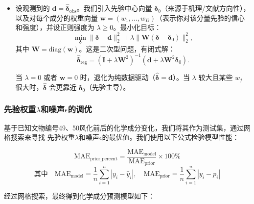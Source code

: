 \documentclass[withoutpreface,bwprint]{cumcmthesis}
\begin{document}
\begin{itemize}

\item 设观测到的 $\boldsymbol{d} = \hat{\boldsymbol{\delta}}_{\text{obs}}$。我们引入先验中心向量 $\boldsymbol{\delta}_0$（来源于机理/文献方向性），以及对每个成分的权重向量 $\mathbf{w} = (w_1, \ldots, w_D)$（表示你对该分量先验的信心和强度），并设正则强度为 $\lambda \geq 0$。最小化目标：
\[
\min_{\boldsymbol{\delta}} \|\boldsymbol{\delta} - \boldsymbol{d}\|_2^2 + \lambda \|\mathbf{W}(\boldsymbol{\delta} - \boldsymbol{\delta}_0)\|_2^2,
\]
其中 $\mathbf{W} = \text{diag}(\mathbf{w})$。这是二次型问题，有闭式解：
\[
\hat{\boldsymbol{\delta}}_{\text{reg}} = (\mathbf{I} + \lambda \mathbf{W}^2)^{-1} (\boldsymbol{d} + \lambda \mathbf{W}^2 \boldsymbol{\delta}_0).
\]

当 $\lambda = 0$ 或者 $\mathbf{w} = 0$ 时，退化为纯数据驱动（$\hat{\boldsymbol{\delta}} = \boldsymbol{d}$）。当 $\lambda$ 较大且某些 $w_j$ 很大时，$\hat{\boldsymbol{\delta}}$ 会更靠近 $\boldsymbol{\delta}_0$（先验主导）。

\end{itemize}

\subsubsection{先验权重$\lambda$和噪声$\epsilon$的调优}

基于已知文物编号49、50风化前后的化学成分变化，我们将其作为测试集，通过网格搜索来寻找
先验权重$\lambda$和噪声$\epsilon$的最优值。我们使用以下公式检验模型性能：

\[
	\text{MAE}_{\text{prior\_percent}} = \frac{\text{MAE}_{\text{model}}}{\text{MAE}_{\text{prior}}} \times 100\%
\]
\[
	\text{其中}\quad
	\text{MAE}_{\text{model}} = \frac{1}{n} \sum_{i=1}^{n} \left| y_i - \hat{y}_i \right|, \quad
	\text{MAE}_{\text{prior}} = \frac{1}{n} \sum_{i=1}^{n} \left| y_i - p_i \right|
\]

经过网格搜索，最终得到化学成分预测模型如下：
\end{document}
